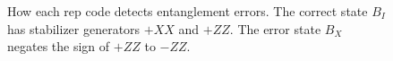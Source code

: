 \documentclass[onecolumn,unpublished,a4paper]{quantumarticle}
\theoremstyle{definition}
\theoremstyle{definition}
\theoremstyle{definition}
\begin{document}
\begin{figure}
    \centering
    \caption{
        How each rep code detects entanglement errors.
        The correct state $B_I$ has stabilizer generators $+XX$ and $+ZZ$.
        The error state $B_X$ negates the sign of $+ZZ$ to $-ZZ$.
}
\end{figure}
\end{document}

